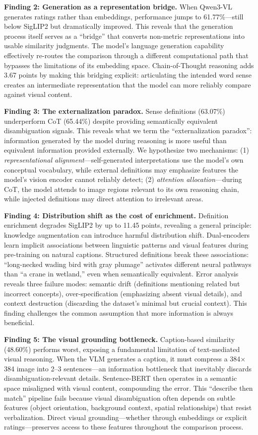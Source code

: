 \documentclass[11pt]{article}
\begin{document}
\textbf{Finding 2: Generation as a representation bridge.} When Qwen3-VL generates ratings rather than embeddings, performance jumps to 61.77\%---still below SigLIP2 but dramatically improved. This reveals that the generation process itself serves as a ``bridge'' that converts non-metric representations into usable similarity judgments. The model's language generation capability effectively re-routes the comparison through a different computational path that bypasses the limitations of its embedding space. Chain-of-Thought reasoning adds 3.67 points by making this bridging explicit: articulating the intended word sense creates an intermediate representation that the model can more reliably compare against visual content.

\textbf{Finding 3: The externalization paradox.} Sense definitions (63.07\%) underperform CoT (65.44\%) despite providing semantically equivalent disambiguation signals. This reveals what we term the ``externalization paradox'': information generated by the model during reasoning is more useful than equivalent information provided externally. We hypothesize two mechanisms: (1) \textit{representational alignment}---self-generated interpretations use the model's own conceptual vocabulary, while external definitions may emphasize features the model's vision encoder cannot reliably detect; (2) \textit{attention allocation}---during CoT, the model attends to image regions relevant to its own reasoning chain, while injected definitions may direct attention to irrelevant areas.

\textbf{Finding 4: Distribution shift as the cost of enrichment.} Definition enrichment degrades SigLIP2 by up to 11.45 points, revealing a general principle: knowledge augmentation can introduce harmful distribution shift. Dual-encoders learn implicit associations between linguistic patterns and visual features during pre-training on natural captions. Structured definitions break these associations: ``long-necked wading bird with gray plumage'' activates different neural pathways than ``a crane in wetland,'' even when semantically equivalent. Error analysis reveals three failure modes: semantic drift (definitions mentioning related but incorrect concepts), over-specification (emphasizing absent visual details), and context destruction (discarding the dataset's minimal but crucial context). This finding challenges the common assumption that more information is always beneficial.

\textbf{Finding 5: The visual grounding bottleneck.} Caption-based similarity (48.60\%) performs worst, exposing a fundamental limitation of text-mediated visual reasoning. When the VLM generates a caption, it must compress a 384$\times$384 image into 2--3 sentences---an information bottleneck that inevitably discards disambiguation-relevant details. Sentence-BERT then operates in a semantic space misaligned with visual content, compounding the error. This ``describe then match'' pipeline fails because visual disambiguation often depends on subtle features (object orientation, background context, spatial relationships) that resist verbalization. Direct visual grounding---whether through embeddings or explicit ratings---preserves access to these features throughout the comparison process.
\end{document}

